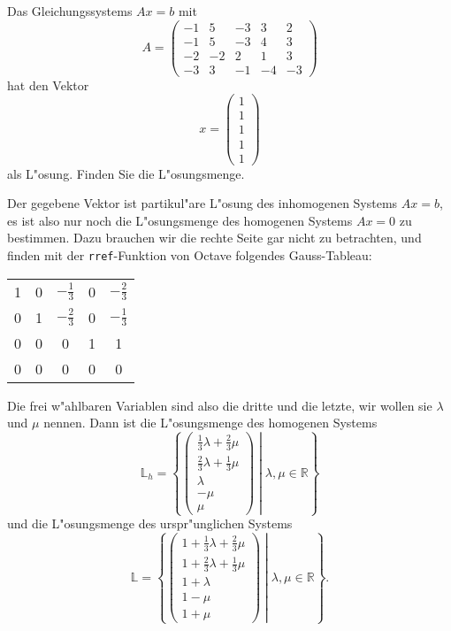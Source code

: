 Das Gleichungssystems $Ax=b$ mit
\[
A=\begin{pmatrix}
-1& 5&-3& 3& 2\\
-1& 5&-3& 4& 3\\
-2&-2& 2& 1& 3\\
-3& 3&-1&-4&-3
\end{pmatrix}
\]
hat den Vektor
\[
x=\begin{pmatrix}1\\1\\1\\1\\1\end{pmatrix}
\]
als L"osung.
Finden Sie die L"osungsmenge.

\begin{loesung}
Der gegebene Vektor ist partikul"are L"osung des inhomogenen Systems
$Ax=b$, es ist also nur noch die L"osungsmenge des homogenen Systems
$Ax=0$ zu bestimmen.
Dazu brauchen wir die rechte Seite gar nicht zu betrachten,
und finden mit der {\tt rref}-Funktion von Octave folgendes Gauss-Tableau:
\begin{center}
\begin{tabular}{|ccccc|}
\hline
1&0&$-\frac13$&0&$-\frac23$\\
0&1&$-\frac23$&0&$-\frac13$\\
0&0&         0&1&1\\
0&0&         0&0&0\\
\hline
\end{tabular}
\end{center}
Die frei w"ahlbaren Variablen sind also die dritte und die letzte,
wir wollen sie $\lambda$ und $\mu$ nennen. Dann ist die L"osungsmenge
des homogenen Systems
\[
{\mathbb L}_h
=
\left\{
\left.
\begin{pmatrix}
\frac13\lambda+\frac23\mu\\
\frac23\lambda+\frac13\mu\\
\lambda\\
-\mu\\
\mu
\end{pmatrix}
\;
\right|
\;
\lambda,\mu\in\mathbb R
\right\}
\]
und die L"osungsmenge des urspr"unglichen Systems
\[
{\mathbb L}
=
\left\{
\left.
\begin{pmatrix}
1+\frac13\lambda+\frac23\mu\\
1+\frac23\lambda+\frac13\mu\\
1+\lambda\\
1-\mu\\
1+\mu
\end{pmatrix}
\;
\right|
\;
\lambda,\mu\in\mathbb R
\right\}.
\]
\end{loesung}
